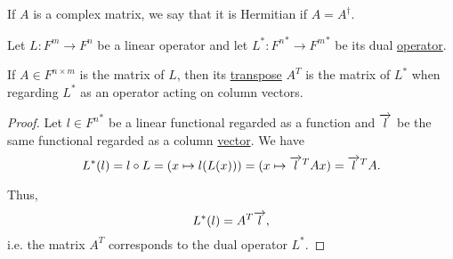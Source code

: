\begin{definition}\label{def:hermitian_matrix}
  If \( A \) is a complex matrix, we say that it is Hermitian if \( A = A^\dagger \).
\end{definition}

\begin{proposition}\label{thm:dual_linear_operator_matrix_transpose}
  Let \( L: F^m \to F^n \) be a linear operator and let \( L^*: {F^n}^* \to {F^m}^* \) be its dual \hyperref[def:dual_linear_operator]{operator}.

  If \( A \in F^{n \times m} \) is the matrix of \( L \), then its \hyperref[def:matrix_transpose]{transpose} \( A^T \) is the matrix of \( L^* \) when regarding \( L^* \) as an operator acting on column vectors.
\end{proposition}
\begin{proof}
  Let \( l \in {F^n}^* \) be a linear functional regarded as a function and \( \overrightarrow{l} \) be the same functional regarded as a column \hyperref[rem:finite_dimensional_dual_space_isomorphism]{vector}. We have
  \begin{equation*}
    L^*(l)
    =
    l \circ L
    =
    (x \mapsto l(L(x)))
    =
    (x \mapsto \overrightarrow{l}^T Ax)
    =
    \overrightarrow{l}^T A.
  \end{equation*}

  Thus,
  \begin{equation*}
    L^*(l) = A^T \overrightarrow{l},
  \end{equation*}
  i.e. the matrix \( A^T \) corresponds to the dual operator \( L^* \).
\end{proof}

